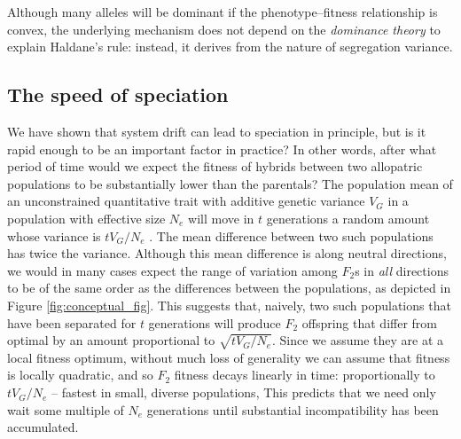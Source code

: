 \documentclass{article}
\newcommand{\plr}[1]{\todo[color=blue!25]{#1}}
\newcommand{\plr}[1]{{\color{blue}\it #1}}
\newcommand{\1}{\mathbbm{1}}
\begin{document}
Although many alleles will be dominant if the phenotype--fitness relationship is convex,
the underlying mechanism does not depend on the \emph{dominance theory} \citep{turelli1995dominance} to explain Haldane's rule:
instead, it derives from the nature of segregation variance.


\subsection*{The speed of speciation}

We have shown that system drift can lead to speciation in principle,
but is it rapid enough to be an important factor in practice?
In other words, after what period of time would we expect the fitness of hybrids
between two allopatric populations to be substantially lower than the parentals?
The population mean of an unconstrained quantitative trait
with additive genetic variance $V_G$ in a population with effective size $N_e$
will move in $t$ generations a random amount whose variance is $t V_G / N_e$ \citep{lande1976natural}.
The mean difference between two such populations has twice the variance.
Although this mean difference is along neutral directions,
we would in many cases expect the range of variation among $F_2$s
in \emph{all} directions to be of the same order
as the differences between the populations, 
as depicted in Figure \ref{fig:conceptual_fig}.
This suggests that, naively, two such populations that have been separated for $t$ generations
will produce $F_2$ offspring that differ from optimal by an amount proportional to $\sqrt{t V_G / N_e}$.
Since we assume they are at a local fitness optimum, without much loss of generality we can assume
that fitness is locally quadratic, and so $F_2$ fitness decays linearly in time:
proportionally to $t V_G / N_e$ -- fastest in small, diverse populations,
This predicts that we need only wait some multiple of $N_e$ generations
until substantial incompatibility has been accumulated.
\end{document}
